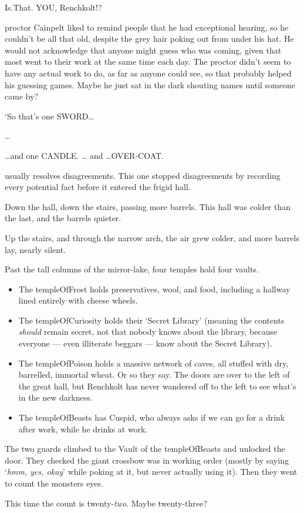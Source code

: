 \begin{exampletext}
  \begin{speechtext}
    Is.That. YOU, Renchkolt!?
  \end{speechtext}

  \Gls{proctor} Cainpelt liked to remind people that he had exceptional hearing, so he couldn't be all that old, despite the grey hair poking out from under his hat.
  He would not acknowledge that anyone might guess who was coming, given that most went to their work at the same time each day.
  The \gls{proctor} didn't seem to have any actual work to do, as far as anyone could see, so that probably helped his guessing games.
  Maybe he just sat in the dark shouting names until someone came by?

  \begin{speechtext}
    `So that's one SWORD\ldots

    \ldots

    \ldots and one CANDLE.
    \ldots
    and
    \ldots OVER-COAT.
  \end{speechtext}

   usually resolves disagreements.
  This one stopped disagreements by recording every potential fact before it entered the frigid hall.

  Down the hall, down the stairs, passing more barrels.
  This hall was colder than the last, and the barrels quieter.

  Up the stairs, and through the narrow arch, the air grew colder, and more barrels lay, nearly silent.

  Past the tall columns of the mirror-lake, four \glspl{temple} hold four vaults.

  \begin{itemize}
    \item
    The \gls{templeOfFrost} holds preservatives, wool, and food, including a hallway lined entirely with cheese wheels.
    \item
    The \gls{templeOfCuriosity} holds their `Secret Library' (meaning the contents \emph{should} remain secret, not that nobody knows about the library, because everyone --- even illiterate beggars --- know about the Secret Library).
    \item
    The \gls{templeOfPoison} holds a massive network of caves, all stuffed with dry, barrelled, immortal wheat.
    Or so they say.
    The doors are over to the left of the great hall, but Renchkolt has never wandered off to the left to see what's in the new darkness.
    \item
    The \gls{templeOfBeasts} has Cuspid, who always asks if we can go for a drink after work, while he drinks at work.
  \end{itemize}

The two \glspl{guard} climbed to the Vault of the \gls{templeOfBeasts} and unlocked the door.
They checked the giant crossbow was in working order (mostly by saying `\textit{hmm, yes, okay}' while poking at it, but never actually using it).
Then they went to count the \glspl{monster} eyes.

This time the count is twenty-\emph{two}.
Maybe twenty-three?

\end{exampletext}

